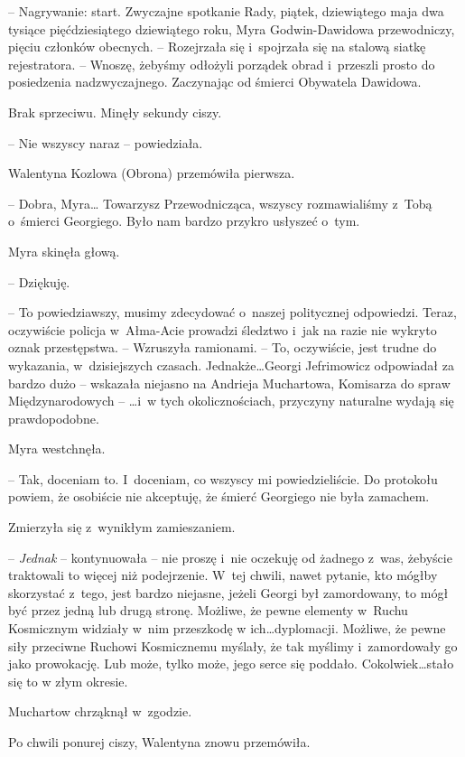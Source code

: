 \documentclass[oneside,polish,11pt,sfheadings]{mwbk}
\begin{document}
-- Nagrywanie: start. Zwyczajne spotkanie Rady, piątek, dziewiątego maja
dwa tysiące pięćdziesiątego dziewiątego roku, Myra Godwin-Dawidowa
przewodniczy, pięciu członków obecnych. -- Rozejrzała się i~spojrzała się
na stalową siatkę rejestratora. -- Wnoszę, żebyśmy odłożyli porządek
obrad i~przeszli prosto do posiedzenia nadzwyczajnego. Zaczynając od
śmierci Obywatela Dawidowa.

Brak sprzeciwu. Minęły sekundy ciszy.

-- Nie wszyscy naraz -- powiedziała.

Walentyna Kozlowa (Obrona) przemówiła pierwsza. 

-- Dobra, Myra\ldots
Towarzysz Przewodnicząca, wszyscy rozmawialiśmy z~Tobą o~śmierci
Georgiego. Było nam bardzo przykro usłyszeć o~tym.

Myra skinęła głową. 

-- Dziękuję.

-- To powiedziawszy, musimy zdecydować o~naszej politycznej odpowiedzi.
Teraz, oczywiście policja w~Ałma-Acie prowadzi śledztwo i~jak na razie
nie wykryto oznak przestępstwa. -- Wzruszyła ramionami. -- To, oczywiście,
jest trudne do wykazania, w~dzisiejszych czasach. Jednakże\ldots Georgi
Jefrimowicz odpowiadał za bardzo dużo -- wskazała niejasno na Andrieja
Muchartowa, Komisarza do spraw Międzynarodowych -- \ldots i~w tych
okolicznościach, przyczyny naturalne wydają się prawdopodobne.

Myra westchnęła. 

-- Tak, doceniam to. I~doceniam, co wszyscy mi
powiedzieliście. Do protokołu powiem, że osobiście nie akceptuję, że
śmierć Georgiego nie była zamachem.

Zmierzyła się z~wynikłym zamieszaniem.

-- \textit{Jednak} -- kontynuowała -- nie proszę i~nie oczekuję od żadnego z~was, żebyście traktowali to więcej niż podejrzenie. W~tej chwili, nawet
pytanie, kto mógłby skorzystać z~tego, jest bardzo niejasne, jeżeli
Georgi był zamordowany, to mógł być przez jedną lub drugą stronę.
Możliwe, że pewne elementy w~Ruchu Kosmicznym widziały w~nim przeszkodę
w ich\ldots dyplomacji. Możliwe, że pewne siły przeciwne Ruchowi
Kosmicznemu myślały, że tak myślimy i~zamordowały go jako prowokację.
Lub może, tylko może, jego serce się poddało. Cokolwiek\ldots stało się to
w złym okresie.

Muchartow chrząknął w~zgodzie.

Po chwili ponurej ciszy, Walentyna znowu przemówiła. 
\end{document}
